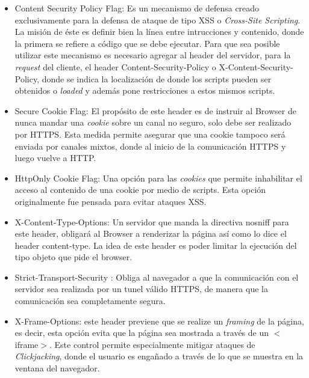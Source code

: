             \begin{itemize}
                \item Content Security Policy Flag: Es un mecanismo de defensa creado exclusivamente para la defensa de ataque de tipo XSS o \textit{Cross-Site Scripting}. La misión de éste es definir bien la línea entre intrucciones y contenido, donde la primera se refiere a código que se debe ejecutar. Para que sea posible utilizar este mecanismo es necesario agregar al header del servidor, para la \textit{request} del cliente, el header Content-Security-Policy o X-Content-Security-Policy, donde se indica la localización de donde los scripts pueden ser obtenidos o \textit{loaded} y además pone restricciones a estos mismos scripts.

                \item Secure Cookie Flag: El propósito de este header es de instruir al Browser de nunca mandar una \textit{cookie} sobre un canal no seguro, solo debe ser realizado por HTTPS. Esta medida permite asegurar que una cookie tampoco será enviada por canales mixtos, donde al inicio de la comunicación HTTPS y luego vuelve a HTTP.

                \item HttpOnly Cookie Flag: Una opción para las \textit{cookies} que permite inhabilitar el acceso al contenido de una cookie por medio de scripts. Esta opción originalmente fue pensada para evitar ataques XSS.

                \item X-Content-Type-Options: Un servidor que manda la directiva nosniff para este header, obligará al Browser a renderizar la página así como lo dice el header content-type. La idea de este header es poder limitar la ejecución del tipo objeto que pide el browser.

                \item Strict-Transport-Security \cite{RFC-6797}: Obliga al navegador a que la comunicación con el servidor sea realizada por un tunel válido HTTPS, de manera que la comunicación sea completamente segura.

                \item X-Frame-Options: este header previene que se realize un \textit{framing} de la página, es decir, esta opción evita que la página sea mostrada a través de un \(<\)iframe\(>\). Este control permite especialmente mitigar ataques de \textit{Clickjacking}, donde el usuario es engañado a través de lo que se muestra en la ventana del navegador.
            \end{itemize}

